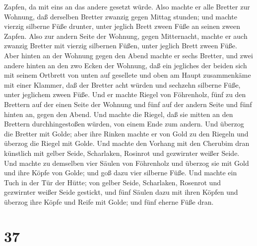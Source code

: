 Zapfen, da mit eins an das andere gesetzt würde. Also machte er alle
Bretter zur Wohnung,  daß derselben Bretter zwanzig gegen
Mittag stunden;  und machte vierzig silberne Füße drunter,
unter jeglich Brett zween Füße an seinen zween Zapfen. 
Also zur andern Seite der Wohnung, gegen Mitternacht, machte er auch
zwanzig Bretter  mit vierzig silbernen Füßen, unter jeglich
Brett zween Füße.  Aber hinten an der Wohnung gegen den
Abend machte er sechs Bretter,  und zwei andere hinten an
den zwo Ecken der Wohnung,  daß ein jegliches der beiden
sich mit seinem Ortbrett von unten auf gesellete und oben am Haupt
zusammenkäme mit einer Klammer,  daß der Bretter acht
würden und sechzehn silberne Füße, unter jeglichem zween Füße.
 Und er machte Riegel von Föhrenholz, fünf zu den Brettern
auf der einen Seite der Wohnung  und fünf auf der andern
Seite und fünf hinten an, gegen den Abend.  Und machte die
Riegel, daß sie mitten an den Brettern durchhingestoßen würden, von
einem Ende zum andern.  Und überzog die Bretter mit Golde;
aber ihre Rinken machte er von Gold zu den Riegeln und überzog die
Riegel mit Golde.  Und machte den Vorhang mit den Cherubim
dran künstlich mit gelber Seide, Scharlaken, Rosinrot und gezwirnter
weißer Seide.  Und machte zu demselben vier Säulen von
Föhrenholz und überzog sie mit Gold und ihre Köpfe von Golde; und goß
dazu vier silberne Füße.  Und machte ein Tuch in der Tür
der Hütte; von gelber Seide, Scharlaken, Rosenrot und gezwirnter weißer
Seide gestickt,  und fünf Säulen dazu mit ihren Köpfen und
überzog ihre Köpfe und Reife mit Golde; und fünf eherne Füße dran.

\hypertarget{section-36}{%
\section{37}\label{section-36}}

